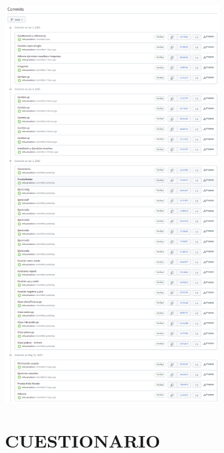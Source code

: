 \documentclass{article}
\begin{document}
\begin{minipage}{\linewidth}
  \centering
  \includegraphics[width=0.7\textwidth]{imagenes/commits.png}
\end{minipage}

\pagebreak


\noindent
\section*{\centering CUESTIONARIO}

\vspace{2\baselineskip}
\end{document}
